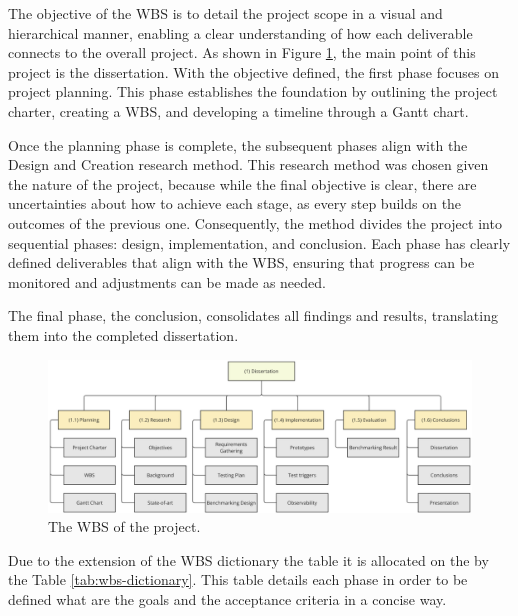 The objective of the \gls{WBS} is to detail the project scope in a visual and hierarchical manner, enabling a clear understanding of how each deliverable connects to the overall project.
As shown in Figure \ref{fig:wbs}, the main point of this project is the dissertation. With the objective defined, the first phase focuses on project planning. This phase establishes the foundation by outlining the project charter, creating a \gls{WBS}, and developing a timeline through a Gantt chart.

Once the planning phase is complete, the subsequent phases align with the Design and Creation research method. This research method was chosen given the nature of the project, because while the final objective is clear, there are uncertainties about how to achieve each stage, as every step builds on the outcomes of the previous one. Consequently, the method divides the project into sequential phases: design, implementation, and conclusion. Each phase has clearly defined deliverables that align with the \gls{WBS}, ensuring that progress can be monitored and adjustments can be made as needed.

The final phase, the conclusion, consolidates all findings and results, translating them into the completed dissertation.

\begin{figure}
      \centering
      \includegraphics[width=\linewidth]{ch-planning/assets/wbs.png}
      \caption{The WBS of the project.}
      \label{fig:wbs}
\end{figure}

Due to the extension of the \gls{WBS} dictionary the table it is allocated on the  by the Table \ref{tab:wbs-dictionary}. This table details each phase in order to be defined what are the goals and the acceptance criteria in a concise way. 

